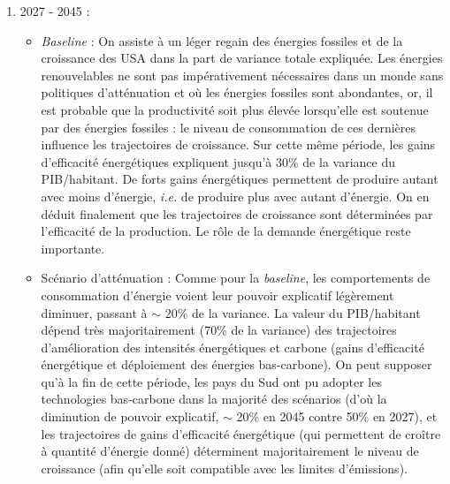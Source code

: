 \documentclass[a4,11pt]{aleph-notas}
\begin{document}
\begin{enumerate}
\begin{itemize}
        \item Atténuation : dans ce scénario, le transfert se fait dans l'autre sens, et on voit la part de l'efficacité énergétique croître fortement. Supposant que le travail investi dans le développement des technologies bas-carbone fait perdre en croissance car il ne permet pas de gains de productivité du travail\footnote{\textit{ibid.}}, on peut soulever l'hypothèse de trajectoires de croissance dirigées par les paramètres régissant l'application des politiques climatiques et le déploiement des technologies bas-carbone (par exemple, les politiques de taxe carbone peuvent entraîner un choc négatif sur la demande d'énergie si le coût de l'énergie est élevé et/ou un choc positif sur l'innovation si des politiques de taxe carbone ont été mises en œuvre\footnote{Fried, Stephie. 2018. "Climate Policy and Innovation: A Quantitative Macroeconomic Analysis." American Economic Journal: Macroeconomics, 10 (1): 90–118. DOI: \url{10.1257/mac.20150289}}).
    \end{itemize}
    \item 2027 - 2045 :
    \begin{itemize}
        \item \textit{Baseline} : On assiste à un léger regain des énergies fossiles et de la croissance des USA dans la part de variance totale expliquée. Les énergies renouvelables ne sont pas impérativement nécessaires dans un monde sans politiques d'atténuation et où les énergies fossiles sont abondantes, or, il est probable que la productivité soit plus élevée lorsqu'elle est soutenue par des énergies fossiles : le niveau de consommation de ces dernières influence les trajectoires de croissance. Sur cette même période, les gains d'efficacité énergétiques expliquent jusqu'à 30\% de la variance du PIB/habitant. De forts gains énergétiques permettent de produire autant avec moins d'énergie, \textit{i.e.} de produire plus avec autant d'énergie. On en déduit finalement que les trajectoires de croissance sont déterminées par l'efficacité de la production. Le rôle de la demande énergétique reste importante.
        \item Scénario d'atténuation : Comme pour la \textit{baseline}, les comportements de consommation d'énergie voient leur pouvoir explicatif légèrement diminuer, passant à $\sim$ 20\% de la variance. La valeur du PIB/habitant dépend très majoritairement (70\% de la variance) des trajectoires d'amélioration des intensités énergétiques et carbone (gains d'efficacité énergétique et déploiement des énergies bas-carbone). On peut supposer qu'à la fin de cette période, les pays du Sud ont pu adopter les technologies bas-carbone dans la majorité des scénarios (d'où la diminution de pouvoir explicatif, $\sim$ 20\% en 2045 contre 50\% en 2027), et les trajectoires de gains d'efficacité énergétique (qui permettent de croître à quantité d'énergie donné) déterminent majoritairement le niveau de croissance (afin qu'elle soit compatible avec les limites d'émissions).

\end{itemize}
\end{enumerate}
\end{document}

